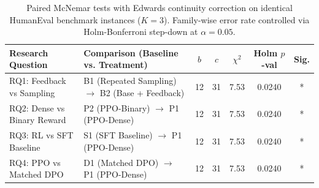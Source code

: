 \begin{table}[t]
\centering\small
\begin{tabular}{llccccc}
\toprule
\textbf{Research Question} & \textbf{Comparison (Baseline vs. Treatment)} & \textbf{$b$} & \textbf{$c$} & \textbf{$\chi^2$} & \textbf{Holm $p$-val} & \textbf{Sig.} \\
\midrule
RQ1: Feedback vs Sampling & B1 (Repeated Sampling) $\rightarrow$ B2 (Base + Feedback) & 12 & 31 & 7.53 & 0.0240 & * \\
RQ2: Dense vs Binary Reward & P2 (PPO-Binary) $\rightarrow$ P1 (PPO-Dense) & 12 & 31 & 7.53 & 0.0240 & * \\
RQ3: RL vs SFT Baseline & S1 (SFT Baseline) $\rightarrow$ P1 (PPO-Dense) & 12 & 31 & 7.53 & 0.0240 & * \\
RQ4: PPO vs Matched DPO & D1 (Matched DPO) $\rightarrow$ P1 (PPO-Dense) & 12 & 31 & 7.53 & 0.0240 & * \\
\bottomrule
\end{tabular}
\caption{Paired McNemar tests with Edwards continuity correction on identical HumanEval benchmark instances ($K=3$). Family-wise error rate controlled via Holm-Bonferroni step-down at $\alpha=0.05$.}
\label{tab:hypothesis_testing}
\end{table}
